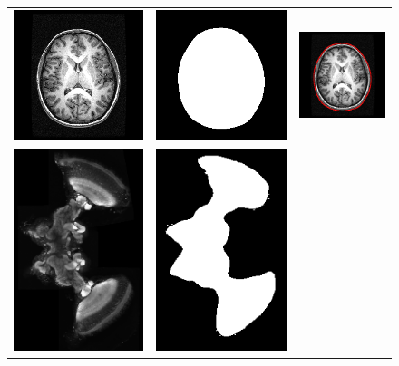 \documentclass{InsightArticle}
\begin{document}
\begin{figure}[tb]
\begin{center}
\begin{tabular}{ccc}
\includegraphics[width=.3\linewidth]{img/levelset_spgr_spgr}&
\includegraphics[width=.3\linewidth]{img/levelset_spgr_mask}&
\includegraphics[width=.3\linewidth]{img/levelset_spgr_ovl} \\
\includegraphics[width=.3\linewidth]{img/levelset_locust_clsm}&
\includegraphics[width=.3\linewidth]{img/levelset_locust_mask}&

\end{tabular}
\end{center}
\end{figure}
\end{document}
